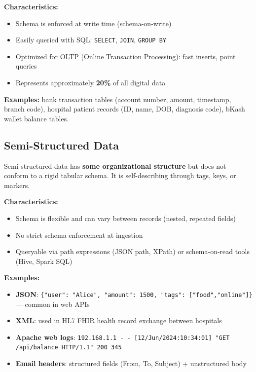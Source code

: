 \documentclass[12pt,a4paper]{article}
\begin{document}
\textbf{Characteristics:}
\begin{itemize}[leftmargin=1.8em]
  \item Schema is enforced at write time (schema-on-write)
  \item Easily queried with SQL: \texttt{SELECT}, \texttt{JOIN}, \texttt{GROUP BY}
  \item Optimized for OLTP (Online Transaction Processing): fast inserts, point queries
  \item Represents approximately \textbf{20\%} of all digital data
\end{itemize}

\textbf{Examples:} bank transaction tables (account number, amount, timestamp, branch code), hospital patient records (ID, name, DOB, diagnosis code), bKash wallet balance tables.

\subsection{Semi-Structured Data}

Semi-structured data has \textbf{some organizational structure} but does not conform to a rigid tabular schema. It is self-describing through tags, keys, or markers.

\textbf{Characteristics:}
\begin{itemize}[leftmargin=1.8em]
  \item Schema is flexible and can vary between records (nested, repeated fields)
  \item No strict schema enforcement at ingestion
  \item Queryable via path expressions (JSON path, XPath) or schema-on-read tools (Hive, Spark SQL)
\end{itemize}

\textbf{Examples:}
\begin{itemize}[leftmargin=1.8em]
  \item \textbf{JSON}: \texttt{\{"user": "Alice", "amount": 1500, "tags": ["food","online"]\}} — common in web APIs
  \item \textbf{XML}: used in HL7 FHIR health record exchange between hospitals
  \item \textbf{Apache web logs}: \texttt{192.168.1.1 - - [12/Jun/2024:10:34:01] "GET /api/balance HTTP/1.1" 200 345}
  \item \textbf{Email headers}: structured fields (From, To, Subject) + unstructured body
\end{itemize}
\end{document}
